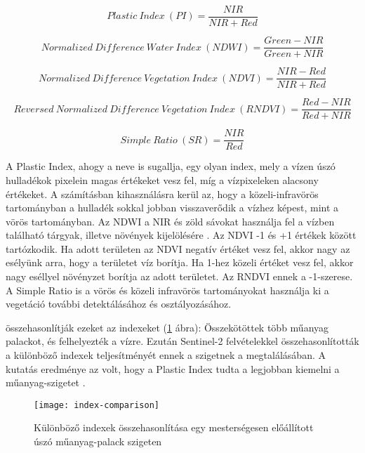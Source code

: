 \begin{equation}\label{eq:pi}
    Plastic \ Index \ (PI) = \frac{NIR}{NIR + Red}
\end{equation}

\begin{equation}\label{eq:ndwi}
    Normalized \ Difference \ Water \ Index \ (NDWI) = \frac{Green - NIR}{Green + NIR}
\end{equation}

\begin{equation}\label{eq:ndvi}
    Normalized \ Difference \ Vegetation \ Index \ (NDVI) = \frac{NIR - Red}{NIR + Red}
\end{equation}

\begin{equation}\label{eq:rndvi}
    Reversed \ Normalized \ Difference \ Vegetation \ Index \ (RNDVI) = \frac{Red - NIR}{Red + NIR}
\end{equation}

\begin{equation}\label{eq:sr}
    Simple \ Ratio \ (SR) = \frac{NIR}{Red}
\end{equation}

A Plastic Index, ahogy a neve is sugallja, egy olyan index, mely a vízen úszó hulladékok pixelein magas értékeket vesz fel, míg a vízpixeleken alacsony értékeket. A számításban kihasználásra kerül az, hogy a közeli-infravörös tartományban a hulladék sokkal jobban visszaverődik a vízhez képest, mint a vörös tartományban. Az NDWI a NIR és zöld sávokat használja fel a vízben található tárgyak, illetve növények kijelölésére \cite{McFeeters1996}. Az NDVI -1 és +1 értékek között tartózkodik. Ha adott területen az NDVI negatív értéket vesz fel, akkor nagy az esélyünk arra, hogy a területet víz borítja. Ha 1-hez közeli értéket vesz fel, akkor nagy eséllyel növényzet borítja az adott területet. Az RNDVI ennek a -1-szerese. A Simple Ratio is a vörös és közeli infravörös tartományokat használja ki a vegetáció további detektálásához és osztályozásához. 

\citeauthor{Themistocleous2020} összehasonlítják ezeket az indexeket (\ref{fig:index-comparison} ábra): Összekötöttek több műanyag palackot, és felhelyezték a vízre. Ezután Sentinel-2 felvételekkel összehasonlították a különböző indexek teljesítményét ennek a szigetnek a megtalálásában. A kutatás eredménye az volt, hogy a Plastic Index tudta a legjobban kiemelni a műanyag-szigetet \cite{Themistocleous2020}.

\begin{figure}[H]
	\centering
	\texttt{[image: index-comparison]}
	\caption{Különböző indexek összehasonlítása egy mesterségesen előállított úszó műanyag-palack szigeten \cite{Themistocleous2020}}
    \label{fig:index-comparison}
\end{figure}

